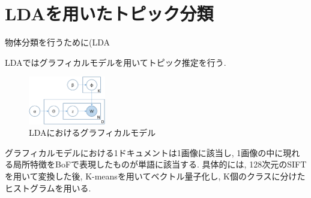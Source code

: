 \section{LDAを用いたトピック分類}
物体分類を行うために(LDA

LDAではグラフィカルモデルを用いてトピック推定を行う.
\begin{figure}[h!]
	\begin{center}
		\includegraphics[width=0.30\textwidth,clip]{img/graphicalmodel.eps}
	\end{center}
	\caption{LDAにおけるグラフィカルモデル}
	\label{fig:graphical_model}
\end{figure} 
\par
グラフィカルモデルにおける1ドキュメントは1画像に該当し, 
1画像の中に現れる局所特徴をBoFで表現したものが単語に該当する.
具体的には, 128次元のSIFT\cite{}を用いて変換した後, 
K-means\cite{kmeans}を用いてベクトル量子化し, K個のクラスに分けたヒストグラムを用いる.
\par

